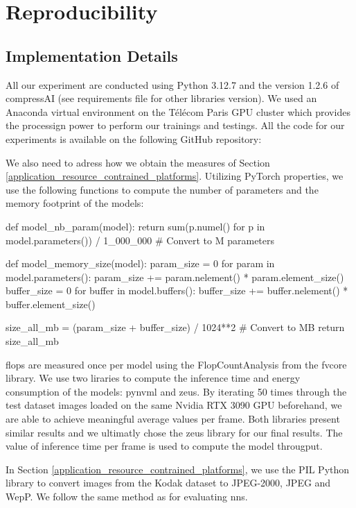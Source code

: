 \appendix

\chapter{Reproducibility}

\section{Implementation Details}
All our experiment are conducted using Python 3.12.7 and the version 1.2.6 of compressAI (see requirements file for other libraries version). We used an Anaconda virtual environment on the Télécom Paris GPU cluster which provides the processign power to perform our trainings and testings. All the code for our experiments is available on the following GitHub repository: \url{}

We also need to adress how we obtain the measures of Section \ref{application_resource_contrained_platforms}. Utilizing PyTorch properties, we use the following functions to compute the number of parameters and the memory footprint of the models:

\begin{pythonCode}
def model_nb_param(model):
    return sum(p.numel() for p in model.parameters()) / 1_000_000 # Convert to M parameters


def model_memory_size(model):
    param_size = 0
    for param in model.parameters():
        param_size += param.nelement() * param.element_size()
    buffer_size = 0
    for buffer in model.buffers():
        buffer_size += buffer.nelement() * buffer.element_size()

    size_all_mb = (param_size + buffer_size) / 1024**2 # Convert to MB
    return size_all_mb
\end{pythonCode}

\acrshort{flop}s are measured once per model using the \textsf{FlopCountAnalysis} from the fvcore library. We use two liraries to compute the inference time and energy consumption of the models: pynvml and zeus. By iterating 50 times through the test dataset images loaded on the same Nvidia RTX 3090 GPU beforehand, we are able to achieve meaningful average values per frame. Both libraries present similar results and we ultimatly chose the zeus library for our final results. The value of inference time per frame is used to compute the model througput.

In Section \ref{application_resource_contrained_platforms}, we use the PIL Python library to convert images from the Kodak dataset to JPEG-2000, JPEG and WepP. We follow the same method as for evaluating \acrshort{nn}s.

